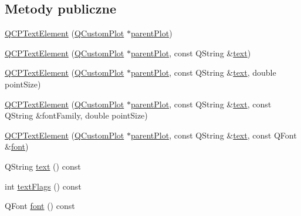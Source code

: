 \subsection*{Metody publiczne}
\begin{DoxyCompactItemize}
\item 
\hyperlink{class_q_c_p_text_element_ae1de18bdb1e7ba959f132018dd9a0258}{Q\+C\+P\+Text\+Element} (\hyperlink{class_q_custom_plot}{Q\+Custom\+Plot} $\ast$\hyperlink{class_q_c_p_layerable_ab7e0e94461566093d36ffc0f5312b109}{parent\+Plot})
\item 
\hyperlink{class_q_c_p_text_element_a00f08a8a3363ad8d7d12ca0db4922b6b}{Q\+C\+P\+Text\+Element} (\hyperlink{class_q_custom_plot}{Q\+Custom\+Plot} $\ast$\hyperlink{class_q_c_p_layerable_ab7e0e94461566093d36ffc0f5312b109}{parent\+Plot}, const Q\+String \&\hyperlink{class_q_c_p_text_element_a472eed865d08fb01da6b1e917afa0fdb}{text})
\item 
\hyperlink{class_q_c_p_text_element_a2684e65def4a5daf80be9f5f149ca9b2}{Q\+C\+P\+Text\+Element} (\hyperlink{class_q_custom_plot}{Q\+Custom\+Plot} $\ast$\hyperlink{class_q_c_p_layerable_ab7e0e94461566093d36ffc0f5312b109}{parent\+Plot}, const Q\+String \&\hyperlink{class_q_c_p_text_element_a472eed865d08fb01da6b1e917afa0fdb}{text}, double point\+Size)
\item 
\hyperlink{class_q_c_p_text_element_adb4bcd3743dbfabfedee4fe9c2ee93da}{Q\+C\+P\+Text\+Element} (\hyperlink{class_q_custom_plot}{Q\+Custom\+Plot} $\ast$\hyperlink{class_q_c_p_layerable_ab7e0e94461566093d36ffc0f5312b109}{parent\+Plot}, const Q\+String \&\hyperlink{class_q_c_p_text_element_a472eed865d08fb01da6b1e917afa0fdb}{text}, const Q\+String \&font\+Family, double point\+Size)
\item 
\hyperlink{class_q_c_p_text_element_a00b75787b77b39bbd083813c2a7b2520}{Q\+C\+P\+Text\+Element} (\hyperlink{class_q_custom_plot}{Q\+Custom\+Plot} $\ast$\hyperlink{class_q_c_p_layerable_ab7e0e94461566093d36ffc0f5312b109}{parent\+Plot}, const Q\+String \&\hyperlink{class_q_c_p_text_element_a472eed865d08fb01da6b1e917afa0fdb}{text}, const Q\+Font \&\hyperlink{class_q_c_p_text_element_a8ac43fe9f2f7087f8616c2c92da26250}{font})
\item 
Q\+String \hyperlink{class_q_c_p_text_element_a472eed865d08fb01da6b1e917afa0fdb}{text} () const 
\item 
int \hyperlink{class_q_c_p_text_element_a6d6fbd03d4936aaa95cc1977e67a1307}{text\+Flags} () const 
\item 
Q\+Font \hyperlink{class_q_c_p_text_element_a8ac43fe9f2f7087f8616c2c92da26250}{font} () const 

\end{DoxyCompactItemize}

